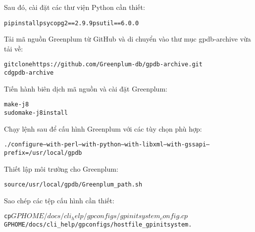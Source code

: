 Sau đó, cài đặt các thư viện Python cần thiết:

\begin{mdframed}[backgroundcolor=white, linecolor=black, roundcorner=5pt]
\begin{alltt}
pip install psycopg2==2.9.9 psutil==6.0.0
\end{alltt}
\end{mdframed}

Tải mã nguồn Greenplum từ GitHub và di chuyển vào thư mục gpdb-archive vừa tải về:

\begin{mdframed}[backgroundcolor=white, linecolor=black, roundcorner=5pt]
\begin{alltt}
git clone https://github.com/Greenplum-db/gpdb-archive.git
cd gpdb-archive
\end{alltt}
\end{mdframed}

Tiến hành biên dịch mã nguồn và cài đặt Greenplum:
\begin{mdframed}[backgroundcolor=white, linecolor=black, roundcorner=5pt]
\begin{alltt}
make -j8 
sudo make -j8 install
\end{alltt}
\end{mdframed}

Chạy lệnh sau để cấu hình Greenplum với các tùy chọn phù hợp:

\begin{mdframed}[backgroundcolor=white, linecolor=black, roundcorner=5pt]
\begin{alltt}
./configure --with-perl --with-python --with-libxml --with-gssapi --prefix=/usr/local/gpdb
\end{alltt}
\end{mdframed}

Thiết lập môi trường cho Greenplum:

\begin{mdframed}[backgroundcolor=white, linecolor=black, roundcorner=5pt]
\begin{alltt}
source /usr/local/gpdb/Greenplum_path.sh
\end{alltt}
\end{mdframed}



Sao chép các tệp cấu hình cần thiết:

\begin{mdframed}[backgroundcolor=white, linecolor=black, roundcorner=5pt]
\begin{alltt}
cp $GPHOME/docs/cli_help/gpconfigs/gpinitsystem_config .
cp $GPHOME/docs/cli_help/gpconfigs/hostfile_gpinitsystem .
\end{alltt}
\end{mdframed}

